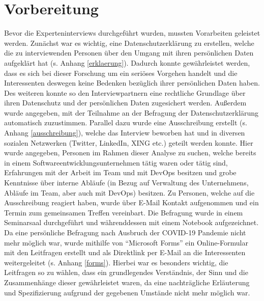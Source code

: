 \section{Vorbereitung}
Bevor die Experteninterviews durchgeführt wurden, mussten Vorarbeiten geleistet werden. Zunächst war es wichtig, eine Datenschutzerklärung zu erstellen, welche die zu interviewenden Personen über den Umgang mit
ihren persönlichen Daten aufgeklärt hat (s. Anhang \ref{erklaerung}). Dadurch konnte gewährleistet werden, dass es sich bei dieser Forschung um ein seriöses Vorgehen handelt und die Interessenten deswegen keine Bedenken
bezüglich ihrer persönlichen Daten haben. Des weiteren konnte so den Interviewpartnern eine rechtliche
Grundlage über ihren Datenschutz und der persönlichen Daten zugesichert werden. Außerdem wurde angegeben, mit der Teilnahme an der Befragung der Datenschutzerklärung automatisch zuzustimmen. \newline 
Parallel dazu wurde eine Ausschreibung erstellt (s. Anhang \ref{ausschreibung}), welche das Interview beworben hat und in diversen sozialen Netzwerken (Twitter, LinkedIn, XING etc.) geteilt werden konnte. Hier wurde angegeben, Personen im Rahmen dieser 
Analyse zu suchen, welche bereits in einem Softwareentwicklungsunternehmen tätig waren oder tätig sind, Erfahrungen mit der Arbeit im Team und mit DevOps besitzen und grobe Kenntnisse über interne Abläufe (in Bezug auf 
Verwaltung des Unternehmens, Abläufe im Team, aber auch mit DevOps) besitzen. \newline \newline
Zu Personen, welche auf die Ausschreibung reagiert haben, wurde über E-Mail Kontakt aufgenommen und ein Termin zum gemeinsamen Treffen vereinbart. Die Befragung wurde in einem Seminarsaal durchgeführt und währenddessen mit
einem Notebook aufgezeichnet. Da eine persönliche Befragung nach Ausbruch der COVID-19 Pandemie nicht mehr möglich war, wurde mithilfe von \enquote{Microsoft Forms} ein Online-Formular mit den Leitfragen erstellt und 
als Direktlink per E-Mail an die Interessenten weitergeleitet (s. Anhang \ref{forms}). Hierbei war es besonders wichtig, die Leitfragen so zu wählen, dass ein grundlegendes Verständnis, der Sinn und die Zusammenhänge dieser gewährleistet waren, 
da eine nachträgliche Erläuterung und Spezifizierung aufgrund der gegebenen Umstände nicht mehr möglich war.

